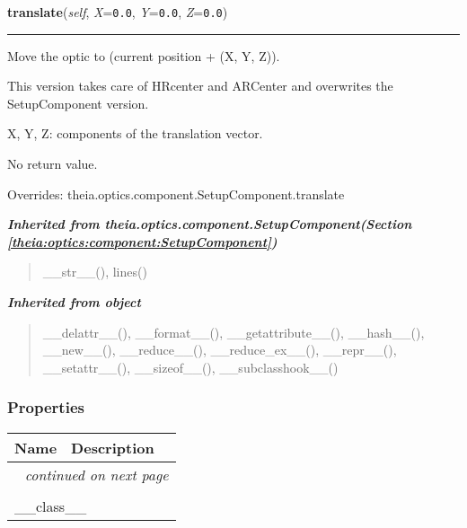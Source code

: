     \vspace{0.5ex}

\hspace{.8\funcindent}\begin{boxedminipage}{\funcwidth}

    \raggedright \textbf{translate}(\textit{self}, \textit{X}={\tt 0.0}, \textit{Y}={\tt 0.0}, \textit{Z}={\tt 0.0})

    \vspace{-1.5ex}

    \rule{\textwidth}{0.5\fboxrule}
\setlength{\parskip}{2ex}
    Move the optic to (current position + (X, Y, Z)).

    This version takes care of HRcenter and ARCenter and overwrites the 
    SetupComponent version.

    X, Y, Z: components of the translation vector.

    No return value.

\setlength{\parskip}{1ex}
      Overrides: theia.optics.component.SetupComponent.translate

    \end{boxedminipage}


\large{\textbf{\textit{Inherited from theia.optics.component.SetupComponent\textit{(Section \ref{theia:optics:component:SetupComponent})}}}}

\begin{quote}
\_\_str\_\_(), lines()
\end{quote}

\large{\textbf{\textit{Inherited from object}}}

\begin{quote}
\_\_delattr\_\_(), \_\_format\_\_(), \_\_getattribute\_\_(), \_\_hash\_\_(), \_\_new\_\_(), \_\_reduce\_\_(), \_\_reduce\_ex\_\_(), \_\_repr\_\_(), \_\_setattr\_\_(), \_\_sizeof\_\_(), \_\_subclasshook\_\_()
\end{quote}


  \subsubsection{Properties}

    \vspace{-1cm}
\hspace{\varindent}\begin{longtable}{|p{\varnamewidth}|p{\vardescrwidth}|l}
\cline{1-2}
\cline{1-2} \centering \textbf{Name} & \centering \textbf{Description}& \\
\cline{1-2}
\endhead\cline{1-2}\multicolumn{3}{r}{\small\textit{continued on next page}}\\\endfoot\cline{1-2}
\endlastfoot\multicolumn{2}{|l|}{\textit{Inherited from object}}\\
\multicolumn{2}{|p{\varwidth}|}{\raggedright \_\_class\_\_}\\
\cline{1-2}
\end{longtable}


